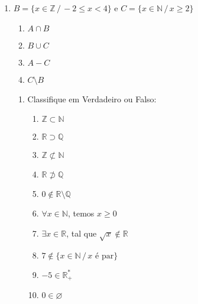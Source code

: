 \documentclass[a4paper]{article}
\begin{document}
\begin{enumerate}

	
	\item $ B = \{x \in \mathbb{Z} \,/\, -2 \leq x < 4 \} $ e 
	$ C = \{x \in \mathbb{N} \,/\, x \geq 2 \} $

\begin{enumerate}

	\item $ A \cap B $
	\item $ B \cup C $
	\item $ A - C $
	\item $ C \setminus B $
	
\end{enumerate}

\begin{enumerate}

\item Classifique em Verdadeiro ou Falso:
	\begin{enumerate}
		\item $ \mathbb{Z} \subset \mathbb{N} $
		\item $ \mathbb{R} \supset \mathbb{Q} $
		\item $ \mathbb{Z} \not\subset \mathbb{N} $
		\item $ \mathbb{R} \not\supset \mathbb{Q} $
		\item $ 0 \not\in \mathbb{R} \setminus \mathbb{Q} $
		\item $ \forall x \in \mathbb{N} $, temos $ x \geq 0 $
		\item $ \exists x \in \mathbb{R} $, tal que $ \sqrt{x} \not\in \mathbb{R} $
		\item $ 7 \not\in \{x \in \mathbb{N} \,/\, x \textrm{ é par} \} $
		\item $ -5 \in \mathbb{R}^*_+ $
		\item $ 0 \in \varnothing $
	\end{enumerate}


\end{enumerate}

\end{enumerate}
\end{document}
